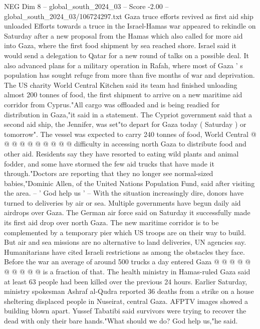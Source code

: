 \begin{textsample}{NEG Dim 8 – global\_south\_2024\_03 – Score -2.00 – global\_south\_2024\_03/106724297.txt}  \label{ex:f8_neg_021}
Gaza truce efforts revived as first aid ship unloaded Efforts towards a truce in the Israel-Hamas war appeared to rekindle on Saturday after a new proposal from the Hamas which also called for more aid into Gaza, where the first food shipment by sea reached shore.
Israel said it would send a delegation to Qatar for a new round of talks on a possible deal.
It also advanced plans for a military operation in Rafah, where most of Gaza ' s population has sought refuge from more than five months of war and deprivation.
The US charity World Central Kitchen said its team had finished unloading almost 200 tonnes of food, the first shipment to arrive on a new maritime aid corridor from Cyprus."All cargo was offloaded and is being readied for distribution in Gaza,"it said in a statement.
The Cypriot government said that a second aid ship, the Jennifer, was set"to depart for Gaza today ( Saturday ) or tomorrow".
The vessel was expected to carry 240 tonnes of food, World Central @ @ @ @ @ @ @ @ @ @ difficulty in accessing north Gaza to distribute food and other aid.
Residents say they have resorted to eating wild plants and animal fodder, and some have stormed the few aid trucks that have made it through."Doctors are reporting that they no longer see normal-sized babies,"Dominic Allen, of the United Nations Population Fund, said after visiting the area. -- ' God help us ' -- With the situation increasingly dire, donors have turned to deliveries by air or sea.
Multiple governments have begun daily aid airdrops over Gaza.
The German air force said on Saturday it successfully made its first aid drop over north Gaza.
The new maritime corridor is to be complemented by a temporary pier which US troops are on their way to build.
But air and sea missions are no alternative to land deliveries, UN agencies say.
Humanitarians have cited Israeli restrictions as among the obstacles they face.
Before the war an average of around 500 trucks a day entered Gaza @ @ @ @ @ @ @ @ @ @ is a fraction of that.
The health ministry in Hamas-ruled Gaza said at least 63 people had been killed over the previous 24 hours.
Earlier Saturday, ministry spokesman Ashraf al-Qudra reported 36 deaths from a strike on a house sheltering displaced people in Nuseirat, central Gaza.
AFPTV images showed a building blown apart.
Yussef Tabatibi said survivors were trying to recover the dead with only their bare hands."What should we do?
God help us,"he said.

\end{textsample}
